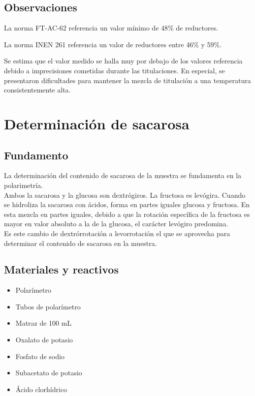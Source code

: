 \documentclass[a4paper,12pt]{article} %
\begin{document}
\subsection{Observaciones}
La norma FT-AC-62 referencia un valor mínimo de 48\% de reductores.

La norma INEN 261 referencia un valor de reductores entre 46\% y 59\%.

Se estima que el valor medido se halla muy por debajo de los valores referencia debido a imprecisiones cometidas durante las titulaciones. En especial, se presentaron dificultades para mantener la mezcla de titulación a una temperatura consistentemente alta.

\section{Determinación de sacarosa}
\subsection{Fundamento}
La determinación del contenido de sacarosa de la muestra se fundamenta en la polarimetría. \\

Ambos la sacarosa y la glucosa son dextrógiros. La fructosa es levógira. Cuando se hidroliza la sacarosa con ácidos, forma en partes iguales glucosa y fructosa. En esta mezcla en partes iguales, debido a que la rotación específica de la fructosa es mayor en valor absoluto a la de la glucosa, el carácter levógiro predomina. \\

Es este cambio de dextrórrotación a levorrotación el que se aprovecha para determinar el contenido de sacarosa en la muestra.
\newpage
\subsection{Materiales y reactivos}
\begin{itemize}
    \item Polarímetro
    \item Tubos de polarímetro
    \item Matraz de 100 mL
    \item Oxalato de potasio
    \item Fosfato de sodio
    \item Subacetato de potasio
    \item Ácido clorhídrico
\end{itemize}
\end{document}
